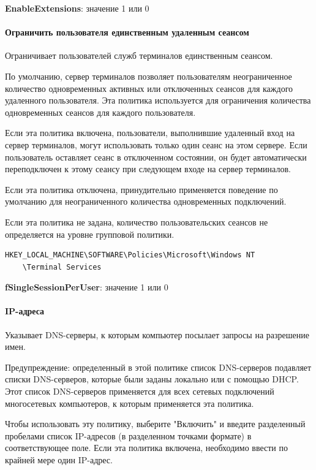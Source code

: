 \documentclass[russian,utf8,emptystyle]{eskdtext}
\begin{document}
\textbf{EnableExtensions}: значение 1 или 0

\paragraph{Ограничить пользователя единственным удаленным сеансом}

Ограничивает пользователей служб терминалов единственным сеансом. 

По умолчанию, сервер терминалов позволяет пользователям неограниченное количество одновременных активных или отключенных сеансов для каждого удаленного пользователя. Эта политика используется для ограничения количества одновременных сеансов для каждого пользователя.

Если эта политика включена, пользователи, выполнившие удаленный вход на сервер терминалов, могут использовать только один сеанс на этом сервере. Если пользователь оставляет сеанс в отключенном состоянии, он будет автоматически переподключен к этому сеансу при следующем входе на сервер терминалов.
 
Если эта политика отключена, принудительно применяется поведение по умолчанию для неограниченного количества одновременных подключений.

Если эта политика не задана, количество пользовательских сеансов не определяется на уровне групповой политики.

\begin{verbatim}
HKEY_LOCAL_MACHINE\SOFTWARE\Policies\Microsoft\Windows NT
    \Terminal Services
\end{verbatim}

\textbf{fSingleSessionPerUser}: значение 1 или 0

\paragraph{IP-адреса}

Указывает DNS-серверы, к которым компьютер посылает запросы на разрешение имен.

Предупреждение: определенный в этой политике список DNS-серверов подавляет списки DNS-серверов, которые были заданы локально или с помощью DHCP. Этот список DNS-серверов применяется для всех сетевых подключений многосетевых компьютеров, к которым применяется эта политика.

Чтобы использовать эту политику, выберите "Включить" и введите разделенный пробелами список IP-адресов (в разделенном точками формате) в соответствующее поле. Если эта политика включена, необходимо ввести по крайней мере один IP-адрес.
\end{document}
